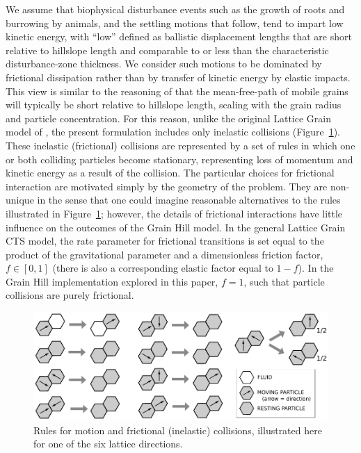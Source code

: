 \documentclass[esurf, manuscript]{copernicus}
\begin{document}
We assume that biophysical disturbance events such as the growth of roots and burrowing by animals, and the settling motions that follow, tend to impart low kinetic energy, with ``low'' defined as ballistic displacement lengths that are short relative to hillslope length and comparable to or less than the characteristic disturbance-zone thickness. We consider such motions to be dominated by frictional dissipation rather than by transfer of kinetic energy by elastic impacts. This view is similar to the reasoning of \citet{furbish2009statistical} that the mean-free-path of mobile grains will typically be short relative to hillslope length, scaling with the grain radius and particle concentration. For this reason, unlike the original Lattice Grain model of \citet{tucker2016celllab}, the present formulation includes only inelastic collisions (Figure~\ref{frictional}). These inelastic (frictional) collisions are represented by a set of rules in which one or both colliding particles become stationary, representing loss of momentum and kinetic energy as a result of the collision. The particular choices for frictional interaction are motivated simply by the geometry of the problem. They are non-unique in the sense that one could imagine reasonable alternatives to the rules illustrated in Figure~\ref{frictional}; however, the details of frictional interactions have little influence on the outcomes of the Grain Hill model. In the general Lattice Grain CTS model, the rate parameter for frictional transitions is set equal to the product of the gravitational parameter and a dimensionless friction factor, $f\in [0,1]$ (there is also a corresponding elastic factor equal to $1-f$). In the Grain Hill implementation explored in this paper, $f=1$, such that particle collisions are purely frictional.


\begin{figure}[t]
\includegraphics{Figures/lattice_grain_friction_rules.pdf}
\caption{Rules for motion and frictional (inelastic) collisions, illustrated here for one of the six lattice directions.}
\label{frictional}
\end{figure}
\end{document}
